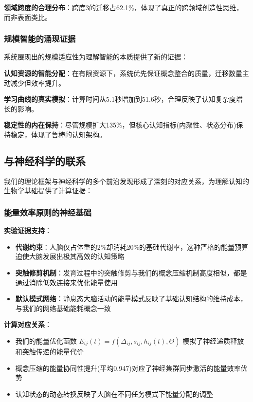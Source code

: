 \documentclass[12pt,a4paper]{article}
\begin{document}
\textbf{领域跨度的合理分布}：跨度3的迁移占62.1\%，体现了真正的跨领域创造性思维，而非表面类比。

\subsubsection{规模智能的涌现证据}
系统展现出的规模适应性为理解智能的本质提供了新的证据：

\textbf{认知资源的智能分配}：在有限资源下，系统优先保证概念整合的质量，迁移数量主动减少但效率提升。

\textbf{学习曲线的真实模拟}：计算时间从5.1秒增加到51.6秒，合理反映了认知复杂度增长的影响。

\textbf{稳定性的内在保持}：尽管规模扩大135\%，但核心认知指标(内聚性、状态分布)保持稳定，体现了鲁棒的认知架构。

\subsection{与神经科学的联系}

我们的理论框架与神经科学的多个前沿发现形成了深刻的对应关系，为理解认知的生物学基础提供了计算证据：

\subsubsection{能量效率原则的神经基础}

\textbf{实验证据支持}：
\begin{itemize}
\item \textbf{代谢约束}：人脑仅占体重的2\%却消耗20\%的基础代谢率，这种严格的能量预算迫使大脑发展出极其高效的认知策略
\item \textbf{突触修剪机制}：发育过程中的突触修剪与我们的概念压缩机制高度相似，都是通过消除低效连接来优化能量使用
\item \textbf{默认模式网络}：静息态大脑活动的能量模式反映了基础认知结构的维持成本，与我们的网络基础能耗概念一致
\end{itemize}

\textbf{计算对应关系}：
\begin{itemize}
\item 我们的能量优化函数 $E_{ij}(t) = f(\Delta_{ij}, s_{ij}, h_{ij}(t), \Theta)$ 模拟了神经递质释放和突触传递的能量代价
\item 概念压缩的能量协同性提升(平均0.947)对应了神经集群同步激活的能量效率优势
\item 认知状态的动态转换反映了大脑在不同任务模式下能量分配的调整
\end{itemize}
\end{document}
